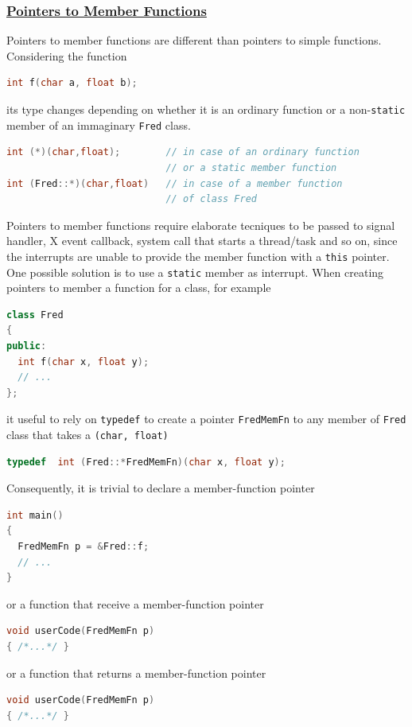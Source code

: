 \subsubsection{\href{https://isocpp.org/wiki/faq/pointers-to-members}{Pointers to Member Functions}}
Pointers to member functions are different than pointers to simple functions.
\newline
Considering the function
\begin{lstlisting}[language=C++]
int f(char a, float b);
\end{lstlisting}
its type changes depending on whether it is an ordinary function or a 
non-\texttt{static} member of an immaginary \texttt{Fred} class.
\begin{lstlisting}[language=C++]
int (*)(char,float);        // in case of an ordinary function
                            // or a static member function
int (Fred::*)(char,float)   // in case of a member function 
                            // of class Fred
\end{lstlisting}
Pointers to member functions require elaborate tecniques to be passed to 
signal handler, X event callback, system call that starts a thread/task 
and so on, since the interrupts are unable to provide the member function 
with a \texttt{this} pointer.
\newline 
One possible solution is to use a \texttt{static} member as interrupt.
\newline
When creating pointers to member a function for a class, for example
\begin{lstlisting}[language=C++]
class Fred 
{
public:
  int f(char x, float y);
  // ...
};
\end{lstlisting}
it useful to rely on \texttt{typedef} to create a pointer \texttt{FredMemFn} 
to any member of \texttt{Fred} class that takes a \texttt{(char, float)}
\begin{lstlisting}[language=C++]
typedef  int (Fred::*FredMemFn)(char x, float y);
\end{lstlisting}
Consequently, it is trivial to declare a member-function pointer
\begin{lstlisting}[language=C++]
int main()
{
  FredMemFn p = &Fred::f;
  // ...
}
\end{lstlisting}
or a function that receive a member-function pointer
\begin{lstlisting}[language=C++]
void userCode(FredMemFn p)
{ /*...*/ }
\end{lstlisting}
or a function that returns a member-function pointer
\begin{lstlisting}[language=C++]
void userCode(FredMemFn p)
{ /*...*/ }
\end{lstlisting}
